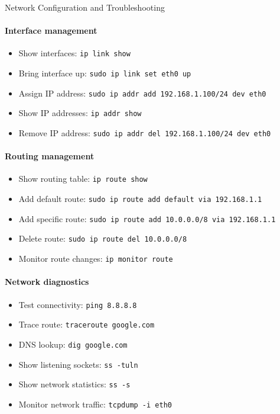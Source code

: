 \begin{KR}{Network Configuration and Troubleshooting}\\
    \paragraph{Interface management}
    \begin{itemize}
        \item Show interfaces: \texttt{ip link show}
        \item Bring interface up: \texttt{sudo ip link set eth0 up}
        \item Assign IP address: \texttt{sudo ip addr add 192.168.1.100/24 dev eth0}
        \item Show IP addresses: \texttt{ip addr show}
        \item Remove IP address: \texttt{sudo ip addr del 192.168.1.100/24 dev eth0}
    \end{itemize}
    
    \paragraph{Routing management}
    \begin{itemize}
        \item Show routing table: \texttt{ip route show}
        \item Add default route: \texttt{sudo ip route add default via 192.168.1.1}
        \item Add specific route: \texttt{sudo ip route add 10.0.0.0/8 via 192.168.1.1}
        \item Delete route: \texttt{sudo ip route del 10.0.0.0/8}
        \item Monitor route changes: \texttt{ip monitor route}
    \end{itemize}
    
    \paragraph{Network diagnostics}
    \begin{itemize}
        \item Test connectivity: \texttt{ping 8.8.8.8}
        \item Trace route: \texttt{traceroute google.com}
        \item DNS lookup: \texttt{dig google.com}
        \item Show listening sockets: \texttt{ss -tuln}
        \item Show network statistics: \texttt{ss -s}
        \item Monitor network traffic: \texttt{tcpdump -i eth0}
    \end{itemize}
    

\end{KR}
